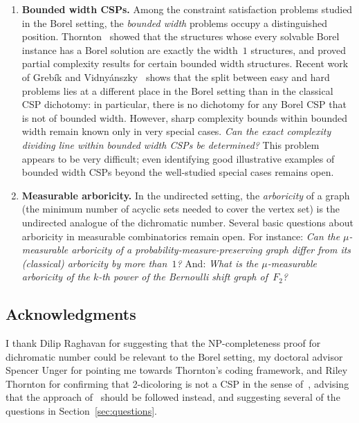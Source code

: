 \documentclass[12pt]{article}
\begin{document}
\begin{enumerate}[label=\textbf{Q\arabic*.},leftmargin=*]
	\item \textbf{Bounded width CSPs.}
	Among the constraint satisfaction problems studied in the Borel setting, the \emph{bounded width} problems occupy a distinguished position.
	Thornton~\cite{thornton2022algebraic} showed that the structures whose every solvable Borel instance has a Borel solution are exactly the width~$1$ structures, and proved partial complexity results for certain bounded width structures.
	Recent work of Grebík and Vidnyánszky~\cite{GV2025} shows that the split between easy and hard problems lies at a different place in the Borel setting than in the classical CSP dichotomy: in particular, there is no dichotomy for any Borel CSP that is not of bounded width.
	However, sharp complexity bounds within bounded width remain known only in very special cases.
	\emph{Can the exact complexity dividing line within bounded width CSPs be determined?}
	This problem appears to be very difficult; even identifying good illustrative examples of bounded width CSPs beyond the well-studied special cases remains open.
	
	\item \textbf{Measurable arboricity.}
	In the undirected setting, the \emph{arboricity} of a graph (the minimum number of acyclic sets needed to cover the vertex set) is the undirected analogue of the dichromatic number.
	Several basic questions about arboricity in measurable combinatorics remain open.
	For instance:
	\emph{Can the $\mu$-measurable arboricity of a probability-measure-preserving graph differ from its (classical) arboricity by more than~$1$?}
	And: \emph{What is the $\mu$-measurable arboricity of the $k$-th power of the Bernoulli shift graph of~$F_2$?}
\end{enumerate}

\subsection*{Acknowledgments}

I thank Dilip Raghavan for suggesting that the NP-completeness proof for dichromatic number could be relevant to the Borel setting, my doctoral advisor Spencer Unger for pointing me towards Thornton's coding framework, and Riley Thornton for confirming that 2-dicoloring is not a CSP in the sense of~\cite{thornton-thesis}, advising that the approach of~\cite[Appendix~A]{thornton2022algebraic} should be followed instead, and suggesting several of the questions in Section~\ref{sec:questions}.

\nocite{*}


\end{document}

